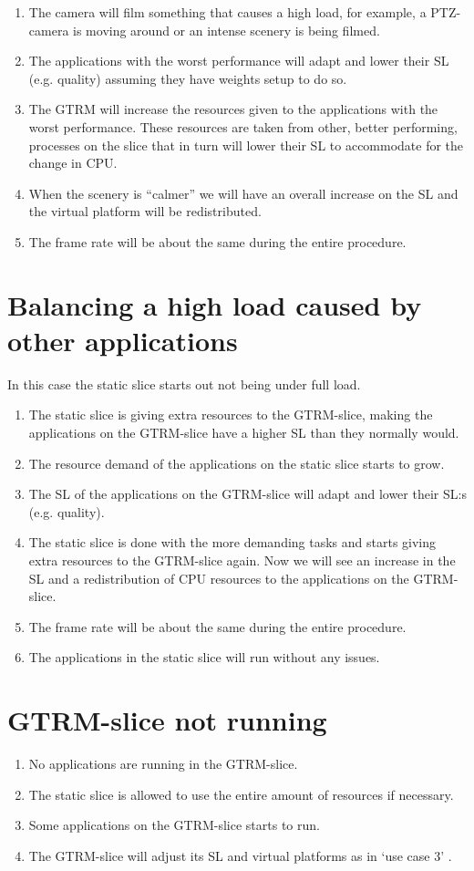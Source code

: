 \documentclass[nobiblatex]{LTHthesis}
\begin{document}
\begin{enumerate}
\item The camera will film something that causes a high load, for example, a PTZ-camera is moving around or an intense scenery is being filmed.
\item The applications with the worst performance  will adapt and lower their SL (e.g. quality) assuming they have weights setup to do so.
\item The GTRM will increase the resources given to the applications with the worst performance. These resources are taken from other, better performing,  processes on the slice that in turn will lower their SL to accommodate for the change in CPU.
\item When the scenery is “calmer” we will have an overall increase on the SL and the virtual platform will be redistributed.
\item The frame rate will be about the same during the entire procedure.
\end{enumerate}
\section{Balancing a high load caused by other applications}
In this case the static slice starts out not being under full load.
\begin{enumerate}
\item The static slice is giving extra resources to the GTRM-slice, making the applications on the GTRM-slice have a higher SL than they normally would.
\item The resource demand of the applications on the static slice starts to grow. 
\item The SL of the applications on the GTRM-slice will adapt and lower their SL:s (e.g. quality).
\item The static slice is done with the more demanding tasks and starts giving extra resources to the GTRM-slice again. Now we will see an increase in the SL and a redistribution of CPU resources to the applications on the GTRM-slice.
\item The frame rate will be about the same during the entire procedure.
\item The applications in the static slice will run without any issues.
\end{enumerate}
\section{GTRM-slice not running}
\begin{enumerate}
\item No applications are running in the GTRM-slice.
\item The static slice is allowed to use the entire amount of resources if necessary.
\item Some applications on the GTRM-slice starts to run.
\item The GTRM-slice will adjust its SL and virtual platforms as in ‘use case 3’ .
\end{enumerate}
\end{document}
